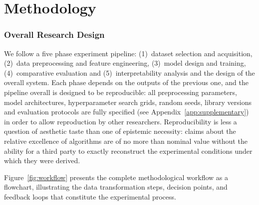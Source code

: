 \chapter{Methodology}
\label{chap:methodology}
\setlength{\parskip}{0.8em}

\subsection{Overall Research Design}

We follow a five phase experiment pipeline: (1)~dataset selection and acquisition, (2)~data preprocessing and feature engineering, (3)~model design and training, (4)~comparative evaluation and (5)~interpretability analysis and the design of the overall system. Each phase depends on the outputs of the previous one, and the pipeline overall is designed to be reproducible: all preprocessing parameters, model architectures, hyperparameter search grids, random seeds, library versions and evaluation protocols are fully specified (see Appendix~\ref{app:supplementary}) in order to allow reproduction by other researchers. Reproducibility is less a question of aesthetic taste than one of epistemic necessity: claims about the relative excellence of algorithms are of no more than nominal value without the ability for a third party to exactly reconstruct the experimental conditions under which they were derived.

Figure~\ref{fig:workflow} presents the complete methodological workflow as a flowchart, illustrating the data transformation steps, decision points, and feedback loops that constitute the experimental process.

